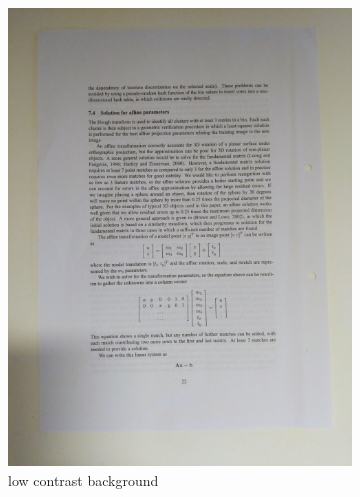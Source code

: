 \documentclass[bibliography=totoc]{scrartcl}
\begin{document}
\begin{figure}[H]
	\centering
	\begin{subfigure}[t]{0.3\linewidth}
		\includegraphics[width=\linewidth]{imgs/not_working/white_background.jpg}
		\caption{low contrast background}
	\end{subfigure}
	\hspace{0.02\textwidth}
	\begin{subfigure}[t]{0.3\linewidth}

\end{subfigure}
\end{figure}
\end{document}
